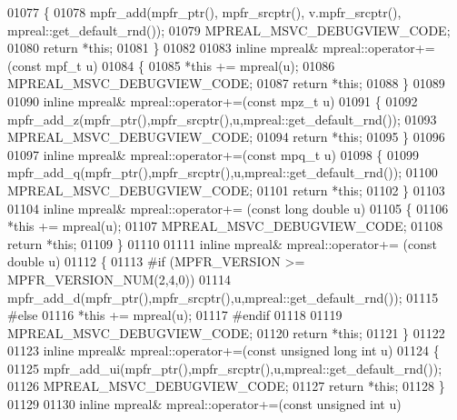 \begin{DoxyCode}
01077 \{
01078     mpfr\_add(mpfr\_ptr(), mpfr\_srcptr(), v.mpfr\_srcptr(), mpreal::get\_default\_rnd());
01079     MPREAL\_MSVC\_DEBUGVIEW\_CODE;
01080     \textcolor{keywordflow}{return} *\textcolor{keyword}{this};
01081 \}
01082 
01083 \textcolor{keyword}{inline} mpreal& mpreal::operator+=(\textcolor{keyword}{const} mpf\_t u)
01084 \{
01085     *\textcolor{keyword}{this} += mpreal(u);
01086     MPREAL\_MSVC\_DEBUGVIEW\_CODE;
01087     \textcolor{keywordflow}{return} *\textcolor{keyword}{this};
01088 \}
01089 
01090 \textcolor{keyword}{inline} mpreal& mpreal::operator+=(\textcolor{keyword}{const} mpz\_t u)
01091 \{
01092     mpfr\_add\_z(mpfr\_ptr(),mpfr\_srcptr(),u,mpreal::get\_default\_rnd());
01093     MPREAL\_MSVC\_DEBUGVIEW\_CODE;
01094     \textcolor{keywordflow}{return} *\textcolor{keyword}{this};
01095 \}
01096 
01097 \textcolor{keyword}{inline} mpreal& mpreal::operator+=(\textcolor{keyword}{const} mpq\_t u)
01098 \{
01099     mpfr\_add\_q(mpfr\_ptr(),mpfr\_srcptr(),u,mpreal::get\_default\_rnd());
01100     MPREAL\_MSVC\_DEBUGVIEW\_CODE;
01101     \textcolor{keywordflow}{return} *\textcolor{keyword}{this};
01102 \}
01103 
01104 \textcolor{keyword}{inline} mpreal& mpreal::operator+= (\textcolor{keyword}{const} \textcolor{keywordtype}{long} \textcolor{keywordtype}{double} u)
01105 \{
01106     *\textcolor{keyword}{this} += mpreal(u);
01107     MPREAL\_MSVC\_DEBUGVIEW\_CODE;
01108     \textcolor{keywordflow}{return} *\textcolor{keyword}{this};
01109 \}
01110 
01111 \textcolor{keyword}{inline} mpreal& mpreal::operator+= (\textcolor{keyword}{const} \textcolor{keywordtype}{double} u)
01112 \{
01113 \textcolor{preprocessor}{#if (MPFR\_VERSION >= MPFR\_VERSION\_NUM(2,4,0))}
01114     mpfr\_add\_d(mpfr\_ptr(),mpfr\_srcptr(),u,mpreal::get\_default\_rnd());
01115 \textcolor{preprocessor}{#else}
01116     *\textcolor{keyword}{this} += mpreal(u);
01117 \textcolor{preprocessor}{#endif}
01118 
01119     MPREAL\_MSVC\_DEBUGVIEW\_CODE;
01120     \textcolor{keywordflow}{return} *\textcolor{keyword}{this};
01121 \}
01122 
01123 \textcolor{keyword}{inline} mpreal& mpreal::operator+=(\textcolor{keyword}{const} \textcolor{keywordtype}{unsigned} \textcolor{keywordtype}{long} \textcolor{keywordtype}{int} u)
01124 \{
01125     mpfr\_add\_ui(mpfr\_ptr(),mpfr\_srcptr(),u,mpreal::get\_default\_rnd());
01126     MPREAL\_MSVC\_DEBUGVIEW\_CODE;
01127     \textcolor{keywordflow}{return} *\textcolor{keyword}{this};
01128 \}
01129 
01130 \textcolor{keyword}{inline} mpreal& mpreal::operator+=(\textcolor{keyword}{const} \textcolor{keywordtype}{unsigned} \textcolor{keywordtype}{int} u)

\end{DoxyCode}
